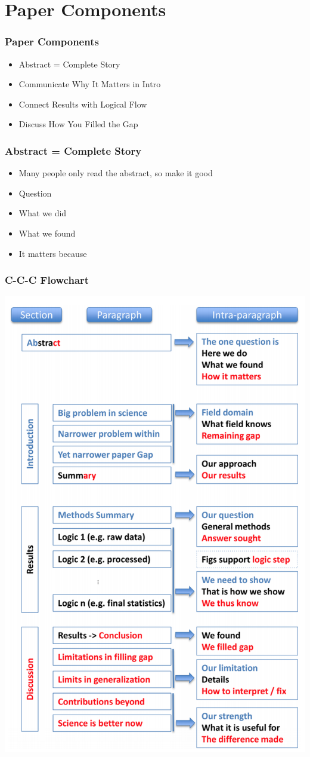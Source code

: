 \documentclass[14pt,handout]{beamer}
\begin{document}
\section{Paper Components}

\begin{frame}
\frametitle{Paper Components}
\begin{itemize}
	\item<+-> Abstract = Complete Story
	\item<+-> Communicate Why It Matters in Intro
	\item<+-> Connect Results with Logical Flow
	\item<+-> Discuss How You Filled the Gap
\end{itemize}
\end{frame}

\begin{frame}
\frametitle{Abstract = Complete Story}
\begin{itemize}
	\item<+-> Many people only read the abstract, so make it good
	\item<+-> Question
	\item<+-> What we did
	\item<+-> What we found
	\item<+-> It matters because 
\end{itemize}
\end{frame}

\begin{frame}
\frametitle{C-C-C Flowchart}
\begin{center}
	\includegraphics[width=.4\textwidth]{images_20171116_flowchart.png}
\end{center}
\end{frame}
\end{document}
